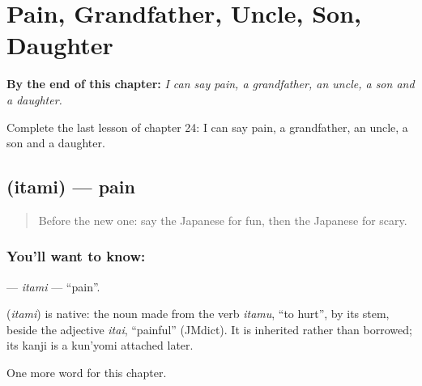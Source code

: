 
\chapter{Pain, Grandfather, Uncle, Son, Daughter}
\label{ch:ja-pain-grandfather-uncle-son-daughter}

\begin{chapteropening}
\textbf{By the end of this chapter:} \emph{I can say pain, a grandfather, an uncle, a son and a daughter.}

Complete the last lesson of chapter 24: I can say pain, a grandfather, an uncle, a son and a daughter.
\end{chapteropening}

\section[\texorpdfstring{\ja{いたみ} (itami)}{いたみ (itami)}]{ (itami) — pain}

\label{lesson:JA-C24-itami}



\begin{quote}
Before the new one: say the Japanese for fun, then the Japanese for scary.
\end{quote}

\subsection*{You'll want to know: }
\textbf{} — \emph{itami} — \textquotedblleft{}pain\textquotedblright{}.

\begin{cousinweb}
\textbf{} (\emph{itami}) is native: the noun made from the verb \emph{itamu}, \textquotedblleft{}to hurt\textquotedblright{}, by its stem, beside the adjective \emph{itai}, \textquotedblleft{}painful\textquotedblright{} (JMdict). It is inherited rather than borrowed; its kanji is a kun'yomi attached later.
\end{cousinweb}

\begin{grammarlens}[title={What you've built}]
One more word for this chapter.
\end{grammarlens}

